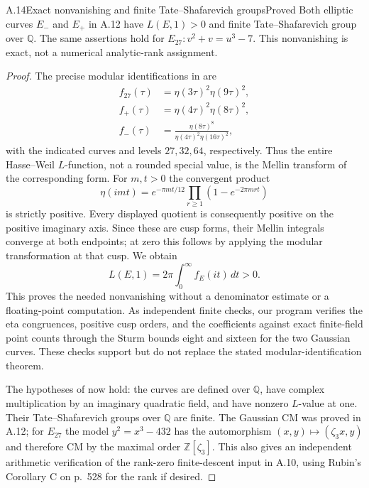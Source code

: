 \begin{statement}{A.14}{Exact nonvanishing and finite Tate--Shafarevich groups}{Proved}
Both elliptic curves $E_-$ and $E_+$ in A.12 have $L(E,1)>0$ and finite
Tate--Shafarevich group over $\mathbb Q$. The same assertions hold for
$E_{27}:v^2+v=u^3-7$. This nonvanishing is exact, not a numerical
analytic-rank assignment.
\end{statement}
\begin{proof}
The precise modular identifications in
\citet[Theorem 2]{AMMartinOno1997} are
\[
 \begin{aligned}
 f_{27}(\tau)&=\eta(3\tau)^2\eta(9\tau)^2,\\
 f_+(\tau)&=\eta(4\tau)^2\eta(8\tau)^2,\\
 f_-(\tau)&=\frac{\eta(8\tau)^8}
                    {\eta(4\tau)^2\eta(16\tau)^2},
 \end{aligned}
\]
with the indicated curves and levels $27,32,64$, respectively. Thus
the entire Hasse--Weil $L$-function, not a rounded special value, is
the Mellin transform of the corresponding form. For $m,t>0$ the
convergent product
\[
 \eta(imt)=e^{-\pi mt/12}
              \prod_{r\geq1}(1-e^{-2\pi mrt})
\]
is strictly positive. Every displayed quotient is consequently
positive on the positive imaginary axis. Since these are cusp forms,
their Mellin integrals converge at both endpoints; at zero this follows
by applying the modular transformation at that cusp. We obtain
\[
 L(E,1)=2\pi\int_0^\infty f_E(it)\,dt>0.
\]
This proves the needed nonvanishing without a denominator estimate
or a floating-point computation. As independent finite checks, our
program verifies the eta congruences, positive cusp orders, and the
coefficients against exact finite-field point counts through the
Sturm bounds eight and sixteen for the two Gaussian curves. These
checks support but do not replace the stated modular-identification
theorem.

The hypotheses of \citet[Theorem A, p.~527, and Remark (3), p.~528]
{AMRubin1987} now hold: the curves are defined over $\mathbb Q$, have
complex multiplication by an imaginary quadratic field, and have
nonzero $L$-value at one. Their Tate--Shafarevich groups over
$\mathbb Q$ are finite. The Gaussian CM was proved in A.12; for
$E_{27}$ the model $y^2=x^3-432$ has the automorphism
$(x,y)\mapsto(\zeta_3x,y)$ and therefore CM by the maximal order
$\mathbb Z[\zeta_3]$. This also gives an independent arithmetic
verification of the rank-zero finite-descent input in A.10, using
Rubin's Corollary C on p.~528 for the rank if desired.
\end{proof}

